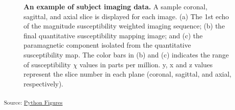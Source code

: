 \documentclass[
true
]{sn-jnl}
\begin{document}
\begin{figure}[H]


\caption{\label{fig-sample}\textbf{An example of subject imaging data.}
A sample coronal, sagittal, and axial slice is displayed for each image.
(a) The 1st echo of the magnitude susceptibility weighted imaging
sequence; (b) the final quantitative susceptibility mapping image; and
(c) the paramagnetic component isolated from the quantitative
susceptibility map. The color bars in (b) and (c) indicates the range of
susceptibility \(\chi\) values in parts per million. y, x and z values
represent the slice number in each plane (coronal, sagittal, and axial,
respectively).}

\end{figure}%

\textsubscript{Source:
\href{https://WeberLab.github.io/Chisep_CSVO2_Manuscript/notebooks/Figures.ipynb.html\#cell-fig-sample}{Python
Figures}}
\end{document}
